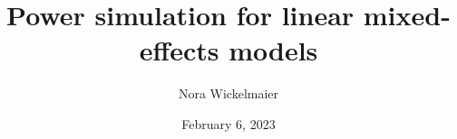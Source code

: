 \documentclass[aspectratio=169]{beamer}
\title{Power simulation for linear mixed-effects models}
\author{Nora Wickelmaier}
\date{February 6, 2023}
\begin{document}
\begin{frame}
\thispagestyle{empty}
\titlepage
\end{frame}


% 
% 
% 
\end{document}
